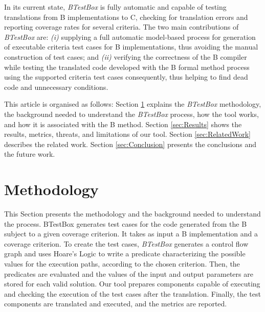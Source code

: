 \documentclass[runningheads]{llncs}
\begin{document}
In its current state,  \textit{BTestBox} is fully automatic and capable of testing translations from B implementations to C, checking for translation errors and reporting coverage rates for several criteria. 
The two main contributions of  \textit{BTestBox} are: 
\textit{(i)} supplying a full automatic model-based process for generation of executable criteria test cases for B implementations, thus avoiding the manual  construction of test cases; and
\textit{(ii)} verifying the correctness of the B compiler while testing the translated code developed with the B formal method process using the supported criteria test cases consequently, thus helping to find dead code and unnecessary conditions.

This article is organised as follows: 
Section \ref{sec:BTestBox} explains the  \textit{BTestBox} methodology, the background needed to understand the  \textit{BTestBox} process, how the tool works, and how it is associated with the B method. 
Section \ref{sec:Results} shows the results, metrics, threats, and limitations of our tool. 
Section \ref{sec:RelatedWork} describes the related work. 
Section \ref{sec:Conclusion} presents the conclusions and the future work.

\section{Methodology} \label{sec:BTestBox}

This Section presents the methodology and the background needed to understand the process. 
BTestBox generates test cases for the code generated from the B subject to a given coverage criterion.
It takes as input a B implementation and a coverage criterion. 
To create the test cases, \textit{BTestBox} generates a control flow graph and uses Hoare's Logic to write a predicate characterizing the possible values for the execution paths, according to the chosen criterion. 
Then, the predicates are evaluated and the values of the input and output parameters are stored for each valid solution. 
Our tool prepares components capable of executing and checking the execution of the test cases after the translation. Finally, the test components are translated and executed, and the metrics are reported.
\end{document}
